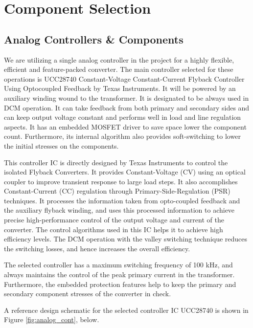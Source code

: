 \section{Component Selection}

\subsection{Analog Controllers \& Components}

We are utilizing a single analog controller in the project for a highly flexible, efficient and feature-packed converter. The main controller selected for these operations is UCC28740 Constant-Voltage Constant-Current Flyback Controller
Using Optocoupled Feedback by Texas Instruments. It will be powered by an auxiliary winding wound to the transformer. It is designated to be always used in DCM operation. It can take feedback from both primary and secondary sides and can keep output voltage constant and performs well in load and line regulation aspects. It has an embedded MOSFET driver to save space lower the component count. Furthermore, its internal algorithm also provides soft-switching to lower the initial stresses on the components.

This controller IC is directly designed by Texas Instruments to control the isolated Flyback Converters. It provides Constant-Voltage (CV) using an optical coupler to improve transient response to large load steps. It also accomplishes Constant-Current (CC) regulation through Primary-Side-Regulation (PSR) techniques. It processes the information taken from opto-coupled feedback and the auxiliary flyback winding, and uses this processed information to achieve precise high-performance control of the output voltage and current of the converter. The control algorithms used in this IC helps it to achieve high efficiency levels. The DCM operation with the valley switching technique reduces the switching losses, and hence increases the overall efficiency.

The selected controller has a maximum switching frequency of 100 kHz, and always maintains the control of the peak primary current in the transformer. Furthermore, the embedded protection features help to keep the primary and secondary component stresses of the converter in check.

A reference design schematic for the selected controller IC UCC28740 is shown in Figure \ref{fig:analog_cont}, below.

